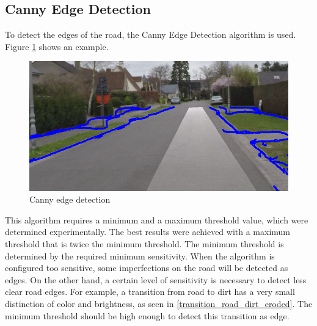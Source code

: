 \documentclass[runningheads,a4paper]{llncs}
\begin{document}
\subsection{Canny Edge Detection}

To detect the edges of the road, the Canny Edge Detection algorithm is used. Figure \ref{canny_edges} shows an example. 


\begin{figure}[ht]
	\centering
	\includegraphics[width=.5\textwidth]{fig/canny_edges.png}
	\caption{Canny edge detection\label{canny_edges}}
\end{figure}

This algorithm requires a minimum and a maximum threshold value, which were determined experimentally. 
The best results were achieved with a maximum threshold that is twice the minimum threshold.
The minimum threshold is determined by the required minimum sensitivity. When the algorithm is configured too sensitive, some imperfections on the road will be detected as edges. On the other hand, a certain level of sensitivity is necessary to detect less clear road edges. For example, a transition from road to dirt has a very small distinction of color and brightness, as seen in \ref{transition_road_dirt_eroded}. The minimum threshold should be high enough to detect this transition as edge. 
\end{document}
